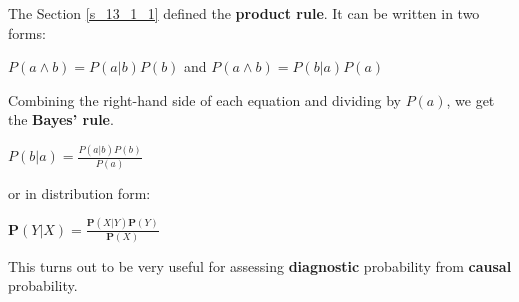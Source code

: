 The Section \ref{s_13_1_1} defined the \textbf{product rule}. It can be written in two forms:
\begin{center}
    $P(a \wedge b) = P(a|b)P(b)$ and $P(a \wedge b) = P(b|a)P(a)$
\end{center}
Combining the right-hand side of each equation and dividing by $P(a)$, we get the \textbf{Bayes' rule}.
\begin{definition}[title={Bayes' theorem}]
    \begin{center}
        $P(b|a) = \frac{P(a|b)P(b)}{P(a)}$ 
    \end{center} \vspace{3.5pt}
    or in distribution form:
    \begin{center}
        $\mathbf{P}(Y|X) = \frac{\mathbf{P}(X|Y)\mathbf{P}(Y)}{\mathbf{P}(X)}$ 
    \end{center}
\end{definition}
This turns out to be very useful for assessing \textbf{diagnostic} probability from \textbf{causal} probability.